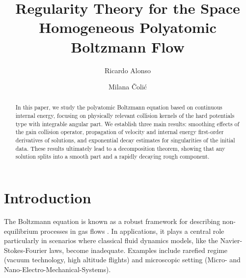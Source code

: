 \documentclass[11pt,a4paper]{amsart}
\begin{document}



	\title[Regularity theory]{Regularity Theory for the Space Homogeneous Polyatomic Boltzmann Flow}
	
		\author[R. Alonso]{Ricardo Alonso}
	\address{Texas A\&M, Division of arts \& sciences, Education City, Doha, Qatar }


	\author[M. \v Coli\'{c}]{Milana \v Coli\'{c}}
		\address{Institute of Mathematics and Scientific Computing, 
		University of Graz, 
		Heinrichstr. 36, 
		8010 Graz, Austria}
	\address{Department of Mathematics and Informatics, 
		Faculty of Sciences, University of Novi Sad, 
		Trg Dositeja Obradovi\'ca 4, 21000 Novi Sad, Serbia}

	
\begin{abstract}
	In this paper, we study the polyatomic Boltzmann equation based on continuous internal energy, focusing on physically relevant collision kernels of the hard potentials type with integrable angular part. We establish three main results: smoothing effects of the gain collision operator, propagation of velocity and internal energy first-order derivatives of solutions, and exponential decay estimates for singularities of the initial data. These results ultimately lead to a decomposition theorem, showing that any solution splits into a smooth part and a rapidly decaying rough component.  
	\end{abstract}


	
\maketitle

\medskip


	
	
\section{Introduction}

The Boltzmann equation is known as  a robust framework for describing non-equilibrium processes in gas flows \cite{torrilhon2016modeling,Rugg-book-2,Kusto-book,Str,Gio}. In applications, it plays a central role  particularly in scenarios where classical fluid dynamics models, like the Navier-Stokes-Fourier laws, become inadequate. Examples include rarefied regime (vacuum technology, high altitude flights) and microscopic setting (Micro- and Nano-Electro-Mechanical-Systems).
\end{document}

